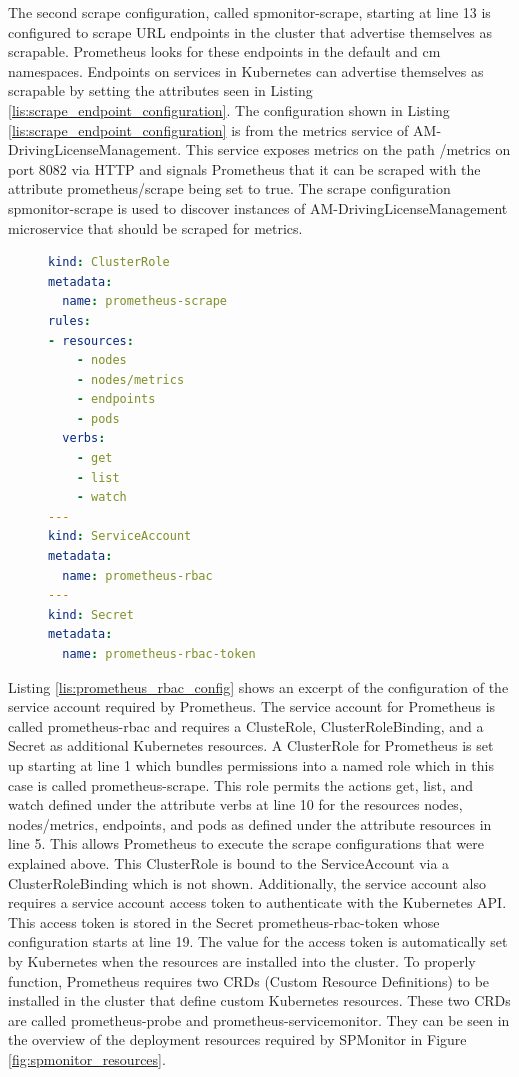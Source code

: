 The second scrape configuration, called spmonitor-scrape, starting at line 13 is configured to scrape URL
endpoints in the cluster that advertise themselves as scrapable. Prometheus looks for these
endpoints in the default and cm namespaces. Endpoints on services in Kubernetes can advertise themselves
as scrapable by setting the attributes seen in Listing \ref{lis:scrape_endpoint_configuration}.
The configuration shown in Listing \ref{lis:scrape_endpoint_configuration} is from
the metrics service of AM-DrivingLicenseManagement. This service exposes
metrics on the path /metrics on port 8082 via HTTP and signals Prometheus that it can
be scraped with the attribute prometheus/scrape being set to true.
The scrape configuration spmonitor-scrape is used to discover instances of AM-DrivingLicenseManagement
microservice that should be scraped for metrics.

\begin{figure}[tb]
\begin{lstlisting}[caption = {Prometheus ServiceAccount Configuration}, label = {lis:prometheus_rbac_config}, style = kit-cm, language=yaml]
kind: ClusterRole
metadata:
  name: prometheus-scrape
rules:
- resources:
    - nodes
    - nodes/metrics
    - endpoints
    - pods
  verbs:
    - get
    - list
    - watch
---
kind: ServiceAccount
metadata:
  name: prometheus-rbac
---
kind: Secret
metadata:
  name: prometheus-rbac-token
\end{lstlisting}
\end{figure}

Listing \ref{lis:prometheus_rbac_config} shows an excerpt of the configuration of the service account
required by Prometheus. The service account for Prometheus is called prometheus-rbac
and requires a ClusteRole, ClusterRoleBinding, and a Secret as additional Kubernetes resources.
A ClusterRole for Prometheus is set up starting at line 1
which bundles permissions into a named role which in this case is called prometheus-scrape.
This role permits the actions get, list, and watch defined under the attribute verbs at line 10
for the resources nodes, nodes/metrics, endpoints, and pods as defined under the attribute resources in line 5.
This allows Prometheus to execute the scrape configurations that were explained above.
This ClusterRole is bound to the ServiceAccount via a ClusterRoleBinding which is not shown.
Additionally, the service account also requires a service account access token to authenticate
with the Kubernetes API. This access token is stored in the Secret prometheus-rbac-token whose configuration starts at line 19.
The value for the access token is automatically set by Kubernetes when the resources
are installed into the cluster. To properly function, Prometheus requires two
CRDs (Custom Resource Definitions) to be installed in the cluster
that define custom Kubernetes resources. These two CRDs are called prometheus-probe
and prometheus-servicemonitor. They can be seen in the overview of the deployment resources
required by SPMonitor in Figure \ref{fig:spmonitor_resources}.

